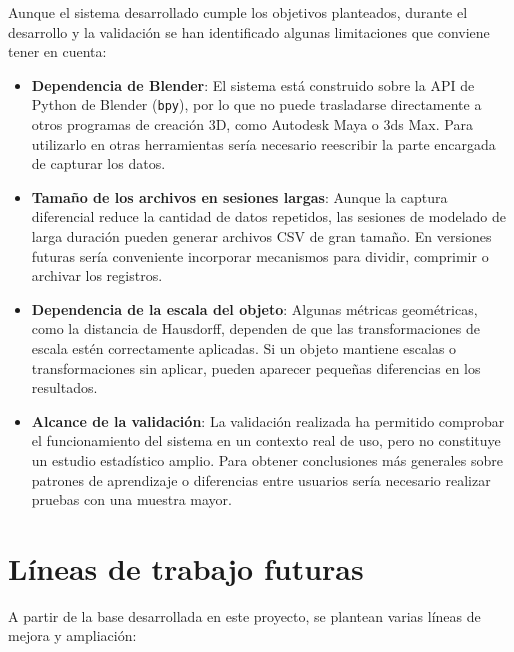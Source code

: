 Aunque el sistema desarrollado cumple los objetivos planteados, durante el desarrollo y la validación se han identificado algunas limitaciones que conviene tener en cuenta:

\begin{itemize}
    \item \textbf{Dependencia de Blender}: El sistema está construido sobre la API de Python de Blender (\texttt{bpy}), por lo que no puede trasladarse directamente a otros programas de creación 3D, como Autodesk Maya o 3ds Max. Para utilizarlo en otras herramientas sería necesario reescribir la parte encargada de capturar los datos.

    \item \textbf{Tamaño de los archivos en sesiones largas}: Aunque la captura diferencial reduce la cantidad de datos repetidos, las sesiones de modelado de larga duración pueden generar archivos CSV de gran tamaño. En versiones futuras sería conveniente incorporar mecanismos para dividir, comprimir o archivar los registros.

    \item \textbf{Dependencia de la escala del objeto}: Algunas métricas geométricas, como la distancia de Hausdorff, dependen de que las transformaciones de escala estén correctamente aplicadas. Si un objeto mantiene escalas o transformaciones sin aplicar, pueden aparecer pequeñas diferencias en los resultados.

    \item \textbf{Alcance de la validación}: La validación realizada ha permitido comprobar el funcionamiento del sistema en un contexto real de uso, pero no constituye un estudio estadístico amplio. Para obtener conclusiones más generales sobre patrones de aprendizaje o diferencias entre usuarios sería necesario realizar pruebas con una muestra mayor.
\end{itemize}

\section{Líneas de trabajo futuras}

A partir de la base desarrollada en este proyecto, se plantean varias líneas de mejora y ampliación:

